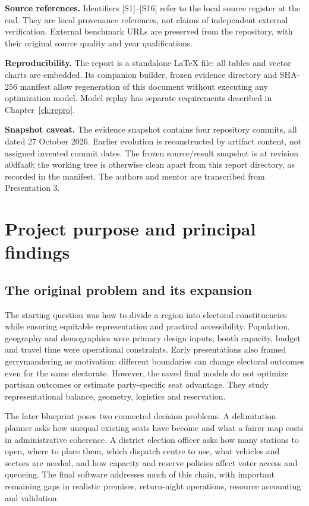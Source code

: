 \documentclass[11pt,a4paper,oneside]{report}
\newcommand{\source}[1]{\par\nopagebreak[4]{\footnotesize\color{teal}Evidence: #1.}\par}
\begin{document}
\textbf{Source references.} Identifiers [S1]--[S16] refer to the local source register at the end. They are local provenance references, not claims of independent external verification. External benchmark URLs are preserved from the repository, with their original source quality and year qualifications.

\textbf{Reproducibility.} The report is a standalone \LaTeX{} file: all tables and vector charts are embedded. Its companion builder, frozen evidence directory and SHA-256 manifest allow regeneration of this document without executing any optimization model. Model replay has separate requirements described in Chapter~\ref{ch:repro}.

\textbf{Snapshot caveat.} The evidence snapshot contains four repository commits, all dated 27 October 2026. Earlier evolution is reconstructed by artifact content, not assigned invented commit dates. The frozen source/result snapshot is at revision a0dfaa0; the working tree is otherwise clean apart from this report directory, as recorded in the manifest. The authors and mentor are transcribed from Presentation 3.

\tableofcontents\listoffigures\listoftables
\clearpage{}

\chapter{Project purpose and principal findings}
\section{The original problem and its expansion}
The starting question was how to divide a region into electoral constituencies while ensuring equitable representation and practical accessibility. Population, geography and demographics were primary design inputs; booth capacity, budget and travel time were operational constraints. Early presentations also framed gerrymandering as motivation: different boundaries can change electoral outcomes even for the same electorate. However, the saved final models do not optimize partisan outcomes or estimate party-specific seat advantage. They study representational balance, geometry, logistics and reservation.

The later blueprint poses two connected decision problems. A delimitation planner asks how unequal existing seats have become and what a fairer map costs in administrative coherence. A district election officer asks how many stations to open, where to place them, which dispatch centre to use, what vehicles and sectors are needed, and how capacity and reserve policies affect voter access and queueing. The final software addresses much of this chain, with important remaining gaps in realistic premises, return-night operations, resource accounting and validation.
\source{[S1], [S2], [S16]}
\end{document}
